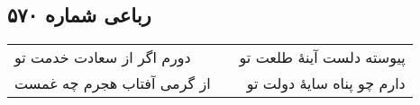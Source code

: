 \begin{center}
\section*{رباعی شماره ۵۷۰}
\label{sec:sh570}
\begin{longtable}{l p{0.5cm} r}
دورم اگر از سعادت خدمت تو
&&
پیوسته دلست آینهٔ طلعت تو
\\
از گرمی آفتاب هجرم چه غمست
&&
دارم چو پناه سایهٔ دولت تو
\\
\end{longtable}
\end{center}
